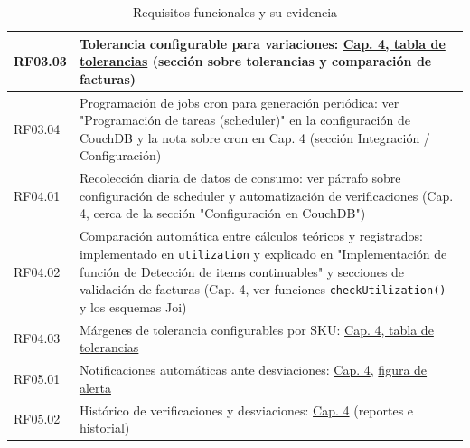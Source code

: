 \begin{table}[h!]
\begin{tabular}{|p{2.2cm}|p{14cm}|}
		\hline
		RF03.03 & Tolerancia configurable para variaciones: \hyperref[tab:tolerancias-factura]{Cap. 4, tabla de tolerancias} (sección sobre tolerancias y comparación de facturas) \\
		\hline
		RF03.04 & Programación de jobs cron para generación periódica: ver "Programación de tareas (scheduler)" en la configuración de CouchDB y la nota sobre cron en Cap. 4 (sección Integración / Configuración) \\
		\hline
		RF04.01 & Recolección diaria de datos de consumo: ver párrafo sobre configuración de scheduler y automatización de verificaciones (Cap. 4, cerca de la sección "Configuración en CouchDB") \\
		\hline
		RF04.02 & Comparación automática entre cálculos teóricos y registrados: implementado en \texttt{utilization} y explicado en "Implementación de función de Detección de items continuables" y secciones de validación de facturas (Cap. 4, ver funciones \texttt{checkUtilization()} y los esquemas Joi) \\
		\hline
		RF04.03 & Márgenes de tolerancia configurables por SKU: \hyperref[tab:tolerancias-factura]{Cap. 4, tabla de tolerancias} \\
		\hline
		RF05.01 & Notificaciones automáticas ante desviaciones: \hyperref[chap:iteraciones]{Cap. 4}, \hyperref[fig:alerta-iteracion1]{figura de alerta} \\
		\hline
		RF05.02 & Histórico de verificaciones y desviaciones: \hyperref[chap:iteraciones]{Cap. 4} (reportes e historial) \\
		\hline
	\end{tabular}
	\caption{Requisitos funcionales y su evidencia}
\end{table}

